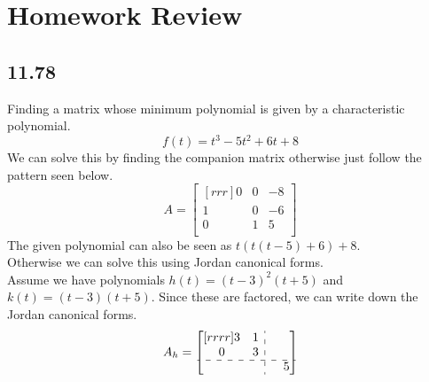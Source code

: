 \documentclass{report}
\newcommand*{\tempb}{\multicolumn{1}{:c}{}} %
\theoremstyle{plain}
\theoremstyle{definition}
\theoremstyle{plain}
\begin{document}
\section{Homework Review}
\subsection{11.78}
Finding a matrix whose minimum polynomial is given by a characteristic polynomial.
\[ f(t)=t^3-5t^2+6t+8 \]
We can solve this by finding the companion matrix otherwise just follow the pattern seen below.
\[ A=\begin{bmatrix}[rrr]0&0&-8\\1&0&-6\\0&1&5\\\end{bmatrix} \]
The given polynomial can also be seen as $t(t(t-5)+6)+8$.\\
Otherwise we can solve this using Jordan canonical forms.\\
Assume we have polynomials $h(t)=(t-3)^2(t+5)$ and $k(t)=(t-3)(t+5)$. Since these are factored, we can write down the Jordan canonical forms.
\[ A_h=\begin{bmatrix}[rrrr]3&1&\tempb&{}\\0&3&\tempb&{}\\\cdashline{1-4} {}&{}&\tempb&5\\\end{bmatrix} \]
\end{document}
